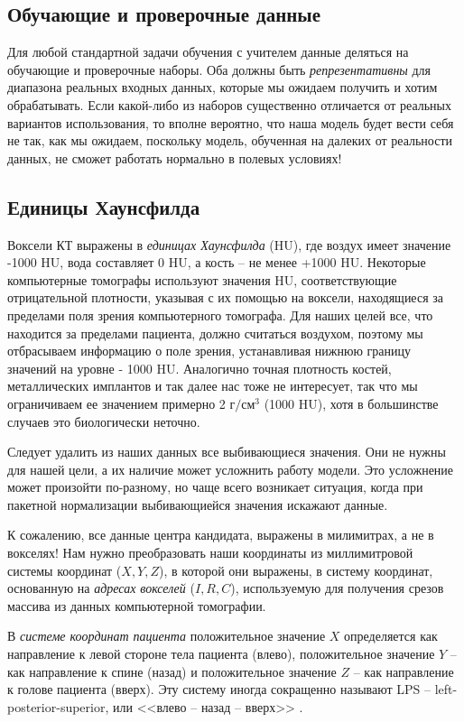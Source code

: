 \documentclass[%
	11pt,
	a4paper,
	utf8,
		]{article}
\begin{document}
\subsection{Обучающие и проверочные данные}

Для любой стандартной задачи обучения с учителем данные деляться на обучающие и проверочные наборы. Оба должны быть \emph{репрезентативны} для диапазона реальных входных данных, которые мы ожидаем получить и хотим обрабатывать. Если какой-либо из наборов существенно отличается от реальных вариантов использования, то вполне вероятно, что наша модель будет вести себя не так, как мы ожидаем, поскольку модель, обученная на далеких от реальности данных, не сможет работать нормально в полевых условиях!

\subsection{Единицы Хаунсфилда}

Воксели КТ выражены в \emph{единицах Хаунсфилда} (HU), где воздух имеет значение -1000 HU, вода составляет 0 HU, а кость -- не менее +1000 HU. Некоторые компьютерные томографы используют значения HU, соответствующие отрицательной плотности, указывая с их помощью на воксели, находящиеся за пределами поля зрения компьютерного томографа. Для наших целей все, что находится за пределами пациента, должно считаться воздухом, поэтому мы отбрасываем информацию о поле зрения, устанавливая нижнюю границу значений на уровне - 1000 HU. Аналогично точная плотность костей, металлических имплантов и так далее нас тоже не интересует, так что мы ограничиваем ее значением примерно 2 $\text{г} / \text{см}^3$ (1000 HU), хотя в большинстве случаев это биологически неточно.

Следует удалить из наших данных все выбивающиеся значения. Они не нужны для нашей цели, а их наличие может усложнить работу модели. Это усложнение может произойти по-разному, но чаще всего возникает ситуация, когда при пакетной нормализации выбивающиейся значения искажают данные.

К сожалению, все данные центра кандидата, выражены в милимитрах, а не в вокселях! Нам нужно преобразовать наши координаты из миллимитровой системы координат ($X, Y, Z$), в которой они выражены, в систему координат, основанную на \emph{адресах вокселей} ($I, R, C$), используемую для получения срезов массива из данных компьютерной томографии.

В \emph{системе координат пациента} положительное значение $X$ определяется как направление к левой стороне тела пациента (влево), положительное значение $Y$ -- как направление к спине (назад) и положительное значение $Z$ -- как направление к голове пациента (вверх). Эту систему иногда сокращенно называют LPS -- left-posterior-superior, или <<влево -- назад -- вверх>> \cite[]{pytorch-2022}.
\end{document}
